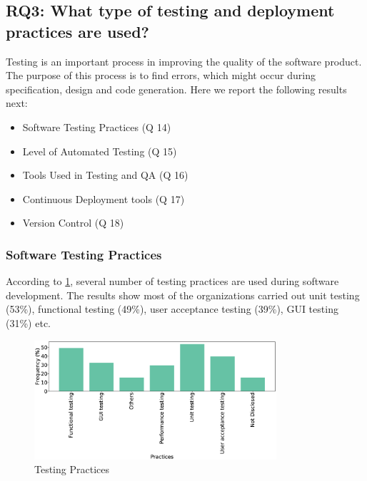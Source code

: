 \subsection{RQ3: What type of testing and deployment practices are used?}
\label{RQ3}
Testing is an important process in improving the quality of the software product. The purpose of this process is to find errors, which might occur during specification, design and code generation. Here we report the following results next:
\begin{itemize}
\item Software Testing Practices (Q 14)
\item Level of Automated Testing (Q 15)
\item Tools Used in Testing and QA (Q 16)
\item Continuous Deployment tools (Q 17)
\item Version Control (Q 18)
\end{itemize}

\subsubsection{Software Testing Practices}
According to \ref{fig:testing}, several number of testing practices are used during software development. The results show most of the organizations carried out unit testing (53\%), functional testing (49\%), user acceptance testing (39\%), GUI testing (31\%) etc.
\begin{figure}[htbp]
\centering
  \includegraphics[width=0.8\textwidth]{Figures/Respondents_testing_practices}
  \caption{Testing Practices}
  \label{fig:testing}
\end{figure}

